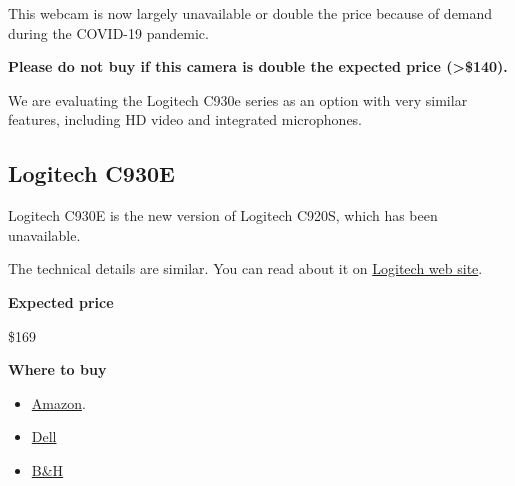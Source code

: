 \begin{gram}
This webcam is now largely unavailable or double the price because of demand during the
COVID-19 pandemic.

\textbf{Please do not buy if this camera is double the expected price (>\$140).}

We are evaluating the Logitech C930e series as an
option with very similar features, including HD video and integrated
microphones.
\end{gram}

\subsection{Logitech C930E}
\label{sec:equipment::logitech-930}
\begin{gram}
\label{grm:equipment::logitech-930::main}
Logitech C930E is the new version of Logitech C920S, which has been unavailable.

The technical details are similar.  You can read about it on
%
\href{https://www.logitech.com/en-us/product/c930e-webcam}{Logitech web site}.

\textbf{Expected price}

\$169

\textbf{Where to buy}

\begin{itemize}
\item
\href{https://www.amazon.com/Logitech-C930e-1080P-Video-Webcam/dp/B00CRJWW2G}{Amazon}.
\item 
\href{https://www.dell.com/en-ca/work/shop/logitech-c930e-hd-webcam/apd/a6880908/pc-accessories}{Dell}
\item
\href{https://www.bhphotovideo.com/c/product/977620-REG/logitech_960_000971_c930e_webcam_usb.html}{B\&H}
\end{itemize}

\end{gram}

